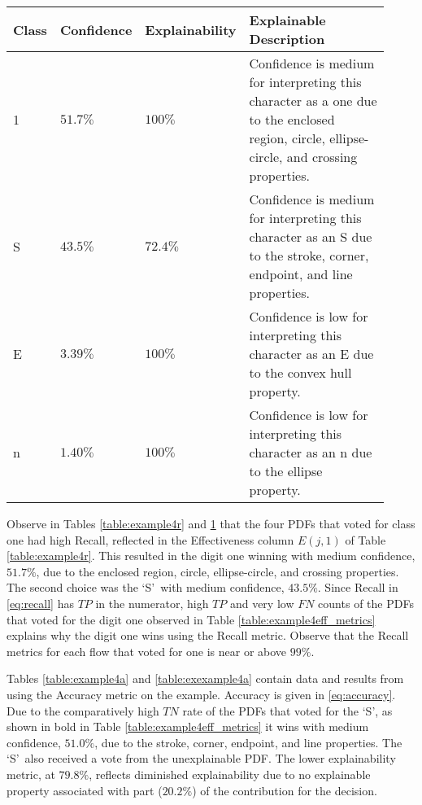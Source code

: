 \begin{table}[H]
    \renewcommand{\arraystretch}{1.3}
     \label{table:exexample4r}
    \begin{center}
    \begin{tabular}{| m{0.06\linewidth} | m{0.14\linewidth} | m{0.17\linewidth} | m{0.55\linewidth} |}
        \hline
         Class & Confidence & Explainability & Explainable Description \\
        \hline \hline
        1 & $51.7\%$ & $100\%$ & Confidence is medium for interpreting this character as a one due to the enclosed region, circle, ellipse-circle, and crossing properties. \\ 
        \hline
        S & $43.5\%$ & $72.4\%$ & Confidence is medium for interpreting this character as an S due to the stroke, corner, endpoint, and line properties. \\
        \hline
        E & $3.39\%$ & $100\%$ & Confidence is low for interpreting this character as an E due to the convex hull property. \\
        \hline
        n & $1.40\%$ & $100\%$ & Confidence is low for interpreting this character as an n due to the ellipse property. \\
        \hline
    \end{tabular}
    \end{center}
\end{table}

Observe in Tables \ref{table:example4r} and \ref{table:exexample4r} that the
four PDFs that voted for class one had high Recall, reflected in the
Effectiveness column $E(j,1)$ of Table \ref{table:example4r}.  This resulted in
the digit one winning with medium confidence, $51.7\%$, due to the enclosed
region, circle, ellipse-circle, and crossing properties.  The second choice was
the \lq{S}\rq~with medium confidence, $43.5\%$. Since Recall in
\eqref{eq:recall} has $TP$ in the numerator, high $TP$ and very low $FN$ counts
of the PDFs that voted for the digit one observed in Table
\ref{table:example4eff_metrics} explains why the digit one wins using the Recall
metric. Observe that the Recall metrics for each flow that voted for one is near
or above $99\%$.

Tables \ref{table:example4a} and \ref{table:exexample4a} contain data and
results from using the Accuracy metric on the example.  Accuracy is given in
\eqref{eq:accuracy}.  Due to the comparatively high $TN$ rate of the PDFs that
voted for the \lq{S}\rq, as shown in bold in Table
\ref{table:example4eff_metrics} it wins with medium confidence, $51.0\%$, due to
the stroke, corner, endpoint, and line properties. The \lq{S}\rq~also received a
vote from the unexplainable PDF.  The lower explainability metric, at $79.8\%$,
reflects diminished explainability due to no explainable property associated
with part ($20.2\%$) of the contribution for the decision.


